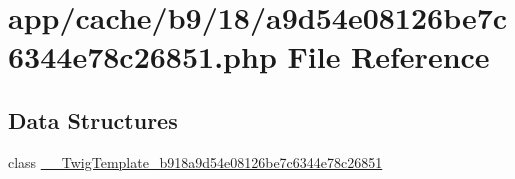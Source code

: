 \hypertarget{a9d54e08126be7c6344e78c26851_8php}{\section{app/cache/b9/18/a9d54e08126be7c6344e78c26851.php File Reference}
\label{a9d54e08126be7c6344e78c26851_8php}
}
\subsection*{Data Structures}
\begin{DoxyCompactItemize}
\item 
class \hyperlink{class_____twig_template__b918a9d54e08126be7c6344e78c26851}{\-\_\-\-\_\-\-Twig\-Template\-\_\-b918a9d54e08126be7c6344e78c26851}
\end{DoxyCompactItemize}
